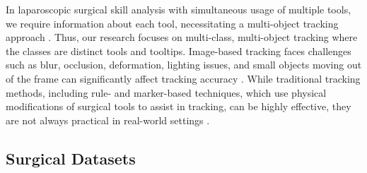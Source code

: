In laparoscopic surgical skill analysis with simultaneous usage of multiple tools, we require information about each tool, necessitating a multi-object tracking approach \cite{yang_image-based_2020}. Thus, our research focuses on multi-class, multi-object tracking where the classes are distinct tools and tooltips. Image-based tracking faces challenges such as blur, occlusion, deformation, lighting issues, and small objects moving out of the frame can significantly affect tracking accuracy \cite{ourselin_real-time_2016, magro_dual-instrument_2024, SurgiTrack}. While traditional tracking methods, including rule- and marker-based techniques, which use physical modifications of surgical tools to assist in tracking, can be highly effective, they are not always practical in real-world settings \cite{bodenstedt_comparative_2018}. 

\subsection{Surgical Datasets}


